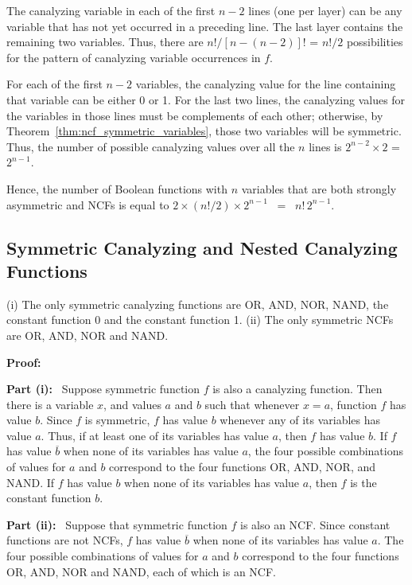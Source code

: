 The canalyzing variable in each of the first $n-2$ lines (one per
layer) can be any variable that has not yet occurred in a preceding
line.  The last layer contains the remaining two variables.  Thus,
there are $n! /[n-(n-2)]!$ = $n!/2$ possibilities for the pattern of 
canalyzing variable occurrences in $f$.

For each of the first $n-2$ variables, the canalyzing value for the line
containing that variable can be either 0 or 1.  
For the last two lines, the canalyzing values for the variables 
in those lines must be complements of each other; otherwise, by 
Theorem~\ref{thm:ncf_symmetric_variables}, those two variables 
will be symmetric.
Thus, the number of possible canalyzing values over all the $n$
lines is $2^{n-2} \times 2$ = $2^{n-1}$.

Hence, the number of Boolean functions with $n$ variables that
are both strongly asymmetric and NCFs is equal to 
$2 \times (n!/2) \times 2^{n-1}$ ~=~ $n!\,2^{n-1}$.  \QED


\subsection{Symmetric Canalyzing and Nested Canalyzing Functions}
\label{sse:sym_and_cf_ncf}

\begin{proposition}\label{pro:ncf_symmetric}
(i) The only symmetric canalyzing functions are OR, AND, NOR, NAND, 
the constant function 0 and the constant function 1.
(ii) The only symmetric NCFs are OR, AND, NOR and NAND.
\end{proposition}
\noindent
\textbf{Proof:}~

\smallskip

\noindent
\textbf{Part (i):}~
Suppose symmetric function $f$ is also a canalyzing function. 
Then there is a variable $x$, and values $a$ and $b$ 
such that whenever $x = a$, function $f$ has value $b$.  
Since $f$ is symmetric, $f$  has
value $b$ whenever any of its variables has value $a$.  
Thus, if at least one of its variables has value $a$, then $f$ has value $b$.  
If $f$ has value $\overline{b}$ when none of its variables has
value $a$, the four possible combinations of values for $a$ and $b$
correspond to the four functions OR, AND, NOR, and NAND.  If $f$
has value $b$ when none of its variables has value $a$, then $f$
is the constant function $b$.

\smallskip

\noindent
\textbf{Part (ii):}~
Suppose that symmetric function $f$ is also an NCF.  
Since constant functions are not NCFs,
$f$ has value $\overline{b}$ when none of its variables has value $a$.
The four possible combinations of values for $a$ and $b$ correspond
to the four functions OR, AND, NOR and NAND, each of which is an
NCF.  \QED









